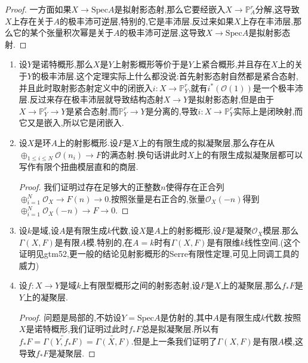 \begin{enumerate}
\begin{proof}
		一方面如果$X\to\mathrm{Spec}A$是拟射影态射,那么它要经嵌入$X\to\mathbb{P}_A^r$分解,这导致$X$上存在关于$A$的极丰沛可逆层,特别的,它是丰沛层.反过来如果$X$上存在丰沛层,那么它的某个张量积次幂是关于$A$的极丰沛可逆层,这导致$X\to\mathrm{Spec}A$是拟射影态射.
	\end{proof}
\end{enumerate}




\begin{enumerate}
	
	\item 设$Y$是诺特概形,那么$X$是$Y$上射影概形等价于是$Y$上紧合概形,并且存在$X$上的关于$Y$的极丰沛层.这个定理实际上什么都没说:首先射影态射自然都是紧合态射,并且此时取射影态射定义中的闭嵌入$i:X\to\mathbb{P}_Y^r$,就有$i^*(\mathscr{O}(1))$是一个极丰沛层.反过来存在极丰沛层就导致结构态射$X\to Y$是拟射影态射,但是由于$X\to\mathbb{P}_Y^r\to Y$是紧合态射,而$\mathbb{P}_Y^r\to Y$是分离的,导致$i:X\to\mathbb{P}_Y^r$实际上是闭映射,而它又是嵌入,所以它是闭嵌入.
	
	\item 设$X$是环$A$上的射影概形.设$F$是$X$上的有限生成的拟凝聚层,那么存在从$\oplus_{1\le i\le N}\mathscr{O}(n_i)\to F$的满态射.换句话讲此时$X$上的有限生成拟凝聚层都可以写作有限个扭曲模层直和的商层.
	\begin{proof}
		
		我们证明过存在足够大的正整数$n$使得存在正合列$\oplus_{i=1}^N\mathscr{O}_X\to F(n)\to0$.按照张量是右正合的,张量$\mathscr{O}_X(-n)$得到$\oplus_{i=1}^N\mathscr{O}_X(-n)\to F\to0$.
	\end{proof}
	\item 设$k$是域,设$A$是有限生成$k$代数,设$X$是$A$上的射影概形,设$F$是凝聚$\mathscr{O}_X$模层.那么$\Gamma(X,F)$是有限$A$模.特别的,在$A=k$时有$\Gamma(X,F)$是有限维$k$线性空间.(这个证明见gtm52,更一般的结论见射影概形的Serre有限性定理,可见上同调工具的威力)
	\item 设$f:X\to Y$是域$k$上有限型概形之间的射影态射,设$F$是$X$上的凝聚层,那么$f_*F$是$Y$上的凝聚层.
	\begin{proof}
		
		问题是局部的,不妨设$Y=\mathrm{Spec}A$是仿射的,其中$A$是有限生成$k$代数.按照$X$是诺特概形,我们证明过此时$f_*F$总是拟凝聚层.所以有$f_*F=\widetilde{\Gamma(Y,f_*F)}=\widetilde{\Gamma(X,F)}$.但是上一条我们证明了$\Gamma(X,F)$是有限$A$模,这导致$f_*F$是凝聚层.
	\end{proof}
\end{enumerate}





